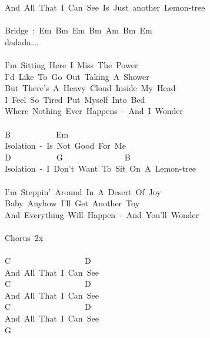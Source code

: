 \documentclass[]{book}
\begin{document}
And~All~That~I~Can~See~Is~Just~another~Lemon-tree\\
~\\
Bridge~:~Em~Bm~Em~Bm~Am~Bm~Em\\
\hspace*{0.333em}\hspace*{0.333em}\hspace*{0.333em}\hspace*{0.333em}\hspace*{0.333em}\hspace*{0.333em}\hspace*{0.333em}\hspace*{0.333em}\hspace*{0.333em}dadada\ldots.\\
~\\
I'm~Sitting~Here~I~Miss~The~Power\\
I'd~Like~To~Go~Out~Taking~A~Shower\\
But~There's~A~Heavy~Cloud~Inside~My~Head\\
I~Feel~So~Tired~Put~Myself~Into~Bed\\
Where~Nothing~Ever~Happens~-~And~I~Wonder\\
~\\
B~~~~~~~~~~~Em\\
Isolation~-~Is~Not~Good~For~Me\\
D~~~~~~~~~~~G~~~~~~~~~~~~~~~B\\
Isolation~-~I~Don't~Want~To~Sit~On~A~Lemon-tree\\
~\\
I'm~Steppin'~Around~In~A~Desert~Of~Joy\\
Baby~Anyhow~I'll~Get~Another~Toy\\
And~Everything~Will~Happen~-~And~You'll~Wonder\\
~\\
Chorus~2x\\
~\\
C~~~~~~~~~~~~~~~~~~D\\
And~All~That~I~Can~See\\
C~~~~~~~~~~~~~~~~~~D\\
And~All~That~I~Can~See\\
C~~~~~~~~~~~~~~~~~~D\\
And~All~That~I~Can~See\\
\hspace*{0.333em}\hspace*{0.333em}\hspace*{0.333em}\hspace*{0.333em}\hspace*{0.333em}\hspace*{0.333em}\hspace*{0.333em}\hspace*{0.333em}\hspace*{0.333em}\hspace*{0.333em}\hspace*{0.333em}\hspace*{0.333em}\hspace*{0.333em}\hspace*{0.333em}\hspace*{0.333em}\hspace*{0.333em}\hspace*{0.333em}G\\
\end{document}
